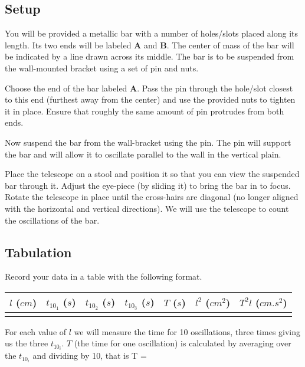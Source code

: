 \documentclass{article}
\begin{document}
      \subsection*{Setup}

         You will be provided a metallic bar with a number of holes/slots placed along its length. Its two ends will be labeled \textbf{A} and \textbf{B}. The center of mass of the bar will be indicated by a line drawn across its middle. The bar is to be suspended from the wall-mounted bracket using a set of pin and nuts.

         Choose the end of the bar labeled \textbf{A}. Pass the pin through the hole/slot closest to this end (furthest away from the center) and use the provided nuts to tighten it in place. Ensure that roughly the same amount of pin protrudes from both ends.

         Now suspend the bar from the wall-bracket using the pin. The pin will support the bar and will allow it to oscillate parallel to the wall in the vertical plain.

         Place the telescope on a stool and position it so that you can view the suspended bar through it. Adjust the eye-piece (by sliding it) to bring the bar in to focus. Rotate the telescope in place until the cross-hairs are diagonal (no longer aligned with the horizontal and vertical directions). We will use the telescope to count the oscillations of the bar.

      \subsection*{Tabulation}

         Record your data in a table with the following format.

         \begin{table}[h]
            \centering

            \begin{tabular}{| c | c | c | c || c || c | c |}

               \hline
               $l$ ($cm$) & $t_{10_1}$ ($s$) & $t_{10_2}$ ($s$) & $t_{10_3}$ ($s$) & $T$ ($s$) & $l^2$ (${cm}^2$) & $T^2 l$ (${cm}.s^2$) \\

               \hline
                  & & & & & & \\
               \hline

            \end{tabular}
         \end{table}
         For each value of $l$ we will measure the time for 10 oscillations, three times giving us the three $t_{10_i}$. $T$ (the time for one oscillation) is calculated by averaging over the $t_{10_i}$ and dividing by 10, that is
         \beq \label{calc_T}
            T = 
         \eeq
\end{document}
